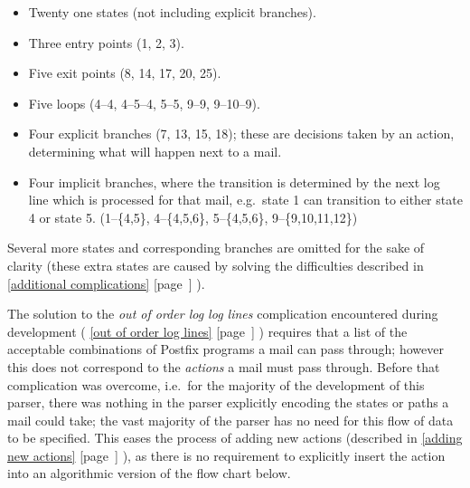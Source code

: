 \documentclass[a4paper,12pt,draft]{article}
\newcommand{\refwithpage}[1]{%
    \empty{}\ref{#1} [page~\pageref{#1}]%
}
\newcommand{\sectionref}[1]{%
    \textsection{}\refwithpage{#1}%
}
\begin{document}
\begin{itemize}

    \item Twenty one states (not including explicit branches).

    \item Three entry points (1, 2, 3).

    \item Five exit points (8, 14, 17, 20, 25).

    \item Five loops (4--4, 4--5--4, 5--5, 9--9, 9--10--9).

    \item Four explicit branches (7, 13, 15, 18); these are decisions taken
        by an action, determining what will happen next to a mail.

    \item Four implicit branches, where the transition is determined by the
        next log line which is processed for that mail, e.g.\ state 1 can
        transition to either state 4 or state 5.  (1--\{4,5\},
        4--\{4,5,6\}, 5--\{4,5,6\}, 9--\{9,10,11,12\})

\end{itemize}

Several more states and corresponding branches are omitted for the sake of
clarity (these extra states are caused by solving the difficulties
described in \sectionref{additional complications}).

The solution to the \textit{out of order log log lines\/} complication
encountered during development (\sectionref{out of order log lines})
requires that a list of the acceptable combinations of Postfix programs a
mail can pass through; however this does not correspond to the
\textit{actions\/} a mail must pass through.  Before that complication was
overcome, i.e.\ for the majority of the development of this parser, there
was nothing in the parser explicitly encoding the states or paths a mail
could take; the vast majority of the parser has no need for this flow of
data to be specified.  This eases the process of adding new actions
(described in \sectionref{adding new actions}), as there is no requirement
to explicitly insert the action into an algorithmic version of the flow
chart below.

\end{document}
